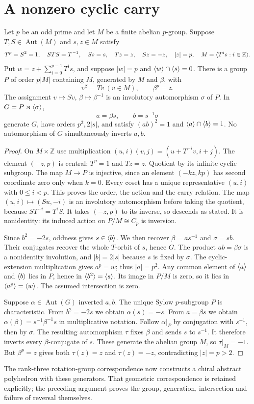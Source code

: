 \section{A nonzero cyclic carry}
\begin{theorem}\label{thm:carry}
Let $p$ be an odd prime and let $M$ be a finite abelian $p$-group.
Suppose $T,S\in\operatorname{Aut}(M)$ and $s,z\in M$ satisfy
\[
T^p=S^2=1,\quad STS=T^{-1},\quad Ss=s,\quad Tz=z,\quad Sz=-z,
\quad |z|=p,\quad M=\langle T^i s:i\in\mathbb Z\rangle.
\]
Put $w=z+\sum_{i=0}^{p-1}T^is$, and suppose $|w|=p$ and
$\langle w\rangle\cap\langle s\rangle=0$. There is a group $P$ of order $p|M|$
containing $M$, generated by $M$ and $\beta$, with
\[
v^\beta=Tv\ (v\in M),\qquad \beta^p=z.
\]
The assignment $v\mapsto Sv$, $\beta\mapsto\beta^{-1}$ is an
involutory automorphism $\sigma$ of $P$. In $G=P\rtimes\langle \sigma\rangle$,
\[
a=\beta s,\qquad b=s^{-1}\sigma
\]
generate $G$, have orders $p^2,2|s|$, and satisfy
$(ab)^2=1$ and $\langle a\rangle\cap\langle b\rangle=1$. No automorphism of $G$
simultaneously inverts $a,b$.
\end{theorem}
\begin{proof}
On $M\times\mathbb Z$ use multiplication
$(u,i)(v,j)=(u+T^{-i}v,i+j)$. The element $(-z,p)$ is central:
$T^p=1$ and $Tz=z$. Quotient by its infinite cyclic subgroup.
The map $M\to P$ is injective, since an element $(-kz,kp)$ has
second coordinate zero only when $k=0$. Every coset has a unique
representative $(u,i)$ with $0\leq i<p$. This proves the order,
the action and the carry relation. The map $(u,i)\mapsto(Su,-i)$
is an involutory automorphism before taking the quotient, because
$ST^{-i}=T^iS$. It takes $(-z,p)$ to its inverse, so descends as stated.
It is nonidentity: its induced action on $P/M\cong C_p$ is inversion.

Since $b^2=-2s$, oddness gives $s\in\langle b\rangle$. We then recover
$\beta=as^{-1}$ and $\sigma=sb$. Their conjugates recover the
whole $T$-orbit of $s$, hence $G$. The product $ab=\beta\sigma$
is a nonidentity involution, and $|b|=2|s|$ because $s$ is fixed
by $\sigma$. The cyclic-extension multiplication gives $a^p=w$;
thus $|a|=p^2$. Any common element of $\langle a\rangle$ and $\langle b\rangle$ lies
in $P$, hence in $\langle b^2\rangle=\langle s\rangle$. Its image in $P/M$ is zero,
so it lies in $\langle a^p\rangle=\langle w\rangle$. The assumed intersection is zero.

Suppose $\alpha\in\operatorname{Aut}(G)$ inverted $a,b$.
The unique Sylow $p$-subgroup $P$ is characteristic. From
$b^2=-2s$ we obtain $\alpha(s)=-s$. From $a=\beta s$ we obtain
$\alpha(\beta)=s^{-1}\beta^{-1}s$ in multiplicative notation.
Follow $\alpha|_P$ by conjugation with $s^{-1}$, then by $\sigma$.
The resulting automorphism $\tau$ fixes $\beta$ and sends $s$ to
$s^{-1}$. It therefore inverts every $\beta$-conjugate of $s$.
These generate the abelian group $M$, so $\tau|_M=-1$.
But $\beta^p=z$ gives both $\tau(z)=z$ and $\tau(z)=-z$,
contradicting $|z|=p>2$.
\end{proof}
The rank-three rotation-group correspondence now constructs a chiral
abstract polyhedron with these generators. That geometric correspondence
is retained explicitly; the preceding argument proves the group,
generation, intersection and failure of reversal themselves.

